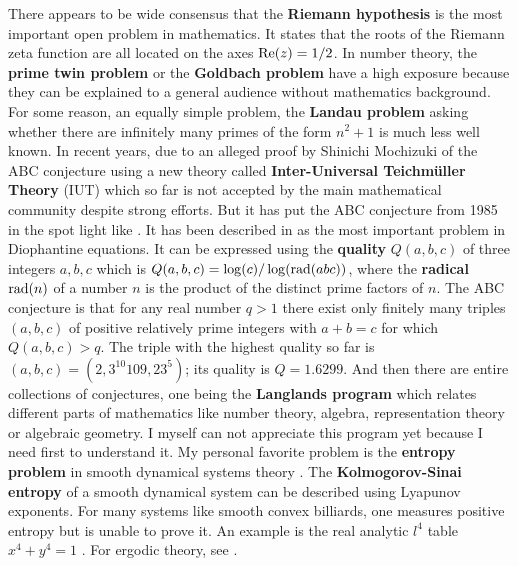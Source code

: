 \documentclass[12pt]{amsart}
\newcounter{example}    \def\example#1{ \item \fontsize{12}{15} \selectfont #1 \fontsize{12}{15} \selectfont }
\begin{document}
There appears to be wide consensus that the {\bf Riemann hypothesis} is the most important open problem in 
mathematics. It states that the roots of the Riemann zeta function are all located on the
axes ${\rm Re}(z)=1/2$. In number theory, the {\bf prime twin problem} or the {\bf Goldbach problem} have
a high exposure because they can be explained to a general audience without mathematics background.
For some reason, an equally simple problem, the {\bf Landau problem} asking whether there are infinitely
many primes of the form $n^2+1$ is much less well known. In recent years, due to an alleged proof
by Shinichi Mochizuki of the ABC conjecture using a new theory called 
{\bf Inter-Universal Teichm\"uller Theory} (IUT) which so far is not accepted by the main mathematical
community despite strong efforts. But it has put the ABC conjecture from 1985 in the spot light like
\cite{WolchoverABC}. It has been described in \cite{GoldFeld1996} as the most important problem in Diophantine
equations. It can be expressed using the {\bf quality} $Q(a,b,c)$ of three integers $a,b,c$ which is 
$Q(a,b,c)=\log(c)/\log({\rm rad}(abc))$, where the {\bf radical} ${\rm rad}(n)$ of a number $n$ is the product of the
distinct prime factors of $n$. The ABC conjecture is that for any real number $q>1$ there exist only finitely many
triples $(a,b,c)$ of positive relatively prime integers with $a+b=c$ for which $Q(a,b,c)>q$. The triple with
the highest quality so far is $(a,b,c)=(2,3^{10} 109, 23^5)$; its quality is $Q=1.6299$. 
And then there are entire collections of conjectures, one being the {\bf Langlands program}
which relates different parts of mathematics like number theory, algebra, 
representation theory or algebraic geometry. I myself can not appreciate this program yet because I need first
to understand it. My personal favorite problem is the {\bf entropy problem}
in smooth dynamical systems theory \cite{Katok2007}. The {\bf Kolmogorov-Sinai entropy} of a smooth 
dynamical system can be described using Lyapunov exponents. For many systems like smooth convex billiards,
one measures positive entropy but is unable to prove it. An example is the real analytic $l^4$ table $x^4+y^4=1$ \cite{JeKn96}.
For ergodic theory, see \cite{CFS,DGS,Friedman,Sinai}.

\end{document}
